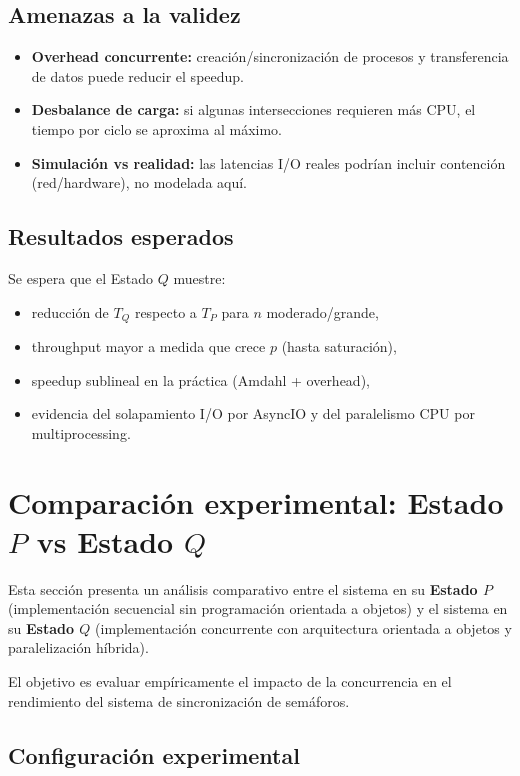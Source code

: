 \documentclass[12pt]{article}
\begin{document}
\subsection{Amenazas a la validez}

\begin{itemize}
\item \textbf{Overhead concurrente:} creación/sincronización de procesos y transferencia de datos puede reducir el speedup.
\item \textbf{Desbalance de carga:} si algunas intersecciones requieren más CPU, el tiempo por ciclo se aproxima al máximo.
\item \textbf{Simulación vs realidad:} las latencias I/O reales podrían incluir contención (red/hardware), no modelada aquí.
\end{itemize}

\subsection{Resultados esperados}

Se espera que el Estado \(Q\) muestre:

\begin{itemize}
\item reducción de \(T_Q\) respecto a \(T_P\) para \(n\) moderado/grande,
\item throughput mayor a medida que crece \(p\) (hasta saturación),
\item speedup sublineal en la práctica (Amdahl + overhead),
\item evidencia del solapamiento I/O por AsyncIO y del paralelismo CPU por multiprocessing.
\end{itemize}

\section{Comparación experimental: Estado \(P\) vs Estado \(Q\)}

Esta sección presenta un análisis comparativo entre el sistema en su
\textbf{Estado \(P\)} (implementación secuencial sin programación orientada a objetos)
y el sistema en su \textbf{Estado \(Q\)} (implementación concurrente con arquitectura
orientada a objetos y paralelización híbrida).

El objetivo es evaluar empíricamente el impacto de la concurrencia en el
rendimiento del sistema de sincronización de semáforos.

\subsection{Configuración experimental}
\end{document}
